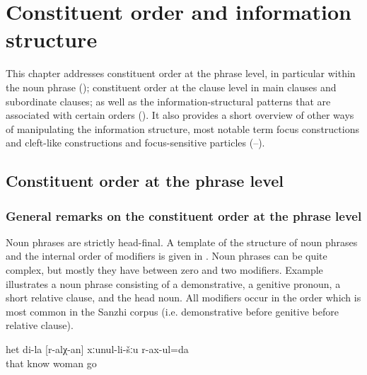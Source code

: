 \chapter{Constituent order and information structure}
\label{cpt:Constituent order and information structure}

This chapter addresses constituent order at the phrase level, in particular within the noun phrase (); constituent order at the clause level in main clauses and subordinate clauses; as well as the information-structural patterns that are associated with certain orders (). It also provides a short overview of other ways of manipulating the information structure, most notable term focus constructions and cleft-like constructions and focus-sensitive particles (--).



\section{Constituent order at the phrase level}
\label{sec:Constituent order at the phrase level}

\subsection{General remarks on the constituent order at the phrase level}
\label{ssec:General remarks on the constituent order at the phrase level}

Noun phrases are strictly head-final. A template of the structure of noun phrases and the internal order of modifiers is given in . Noun phrases can be quite complex, but mostly they have between zero and two modifiers. Example  illustrates a noun phrase consisting of a demonstrative, a genitive pronoun, a short relative clause, and the head noun. All modifiers occur in the order which is most common in the Sanzhi corpus (i.e. demonstrative before genitive before relative clause).
%
\begin{exe}
	\ex	\label{ex:‎‎‎I go to my woman who I know}
	\gll	het	di-la	[r-alχ-an]	xːunul-li-šːu	r-ax-ul=da\\
		that		know	woman	go\\
	\glt	{}
\end{exe}

